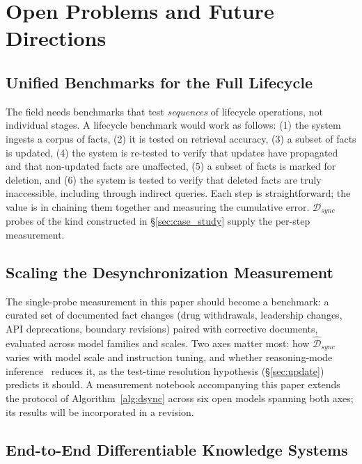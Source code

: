 \documentclass{article}
\begin{document}
\section{Open Problems and Future Directions}
\label{sec:open_problems}

\subsection{Unified Benchmarks for the Full Lifecycle}

The field needs benchmarks that test \textit{sequences} of lifecycle operations, not individual stages. A lifecycle benchmark would work as follows: (1) the system ingests a corpus of facts, (2) it is tested on retrieval accuracy, (3) a subset of facts is updated, (4) the system is re-tested to verify that updates have propagated and that non-updated facts are unaffected, (5) a subset of facts is marked for deletion, and (6) the system is tested to verify that deleted facts are truly inaccessible, including through indirect queries. Each step is straightforward; the value is in chaining them together and measuring the cumulative error. $\mathcal{D}_{sync}$ probes of the kind constructed in \S\ref{sec:case_study} supply the per-step measurement.

\subsection{Scaling the Desynchronization Measurement}

The single-probe measurement in this paper should become a benchmark: a curated set of documented fact changes (drug withdrawals, leadership changes, API deprecations, boundary revisions) paired with corrective documents, evaluated across model families and scales. Two axes matter most: how $\widehat{\mathcal{D}}_{sync}$ varies with model scale and instruction tuning, and whether reasoning-mode inference~\citep{openai2024o1, guo2025deepseekr1} reduces it, as the test-time resolution hypothesis (\S\ref{sec:update}) predicts it should. A measurement notebook accompanying this paper extends the protocol of Algorithm~\ref{alg:dsync} across six open models spanning both axes; its results will be incorporated in a revision.

\subsection{End-to-End Differentiable Knowledge Systems}
\end{document}
